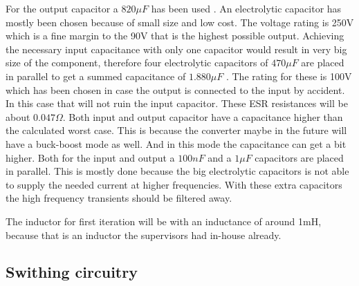 For the output capacitor a $820\mu F$ has been used \cite{cout}. An electrolytic capacitor has mostly been chosen because of small size and low cost. The voltage rating is 250V which is a fine margin to the 90V that is the highest possible output.  
Achieving the necessary input capacitance with only one capacitor would result in very big size of the component, therefore four electrolytic capacitors of $470\mu F$ \cite{cin} are placed in parallel to get a summed capacitance of $1.880\mu F$ . The rating for these is 100V which has been chosen in case the output is connected to the input by accident. In this case that will not ruin the input capacitor. These ESR resistances will be about $0.047\Omega$. Both input and output capacitor have a capacitance higher than the calculated worst case. This is because the converter maybe in the future will have a buck-boost mode as well. And in this mode the capacitance can get a bit higher. 
Both for the input and output a $100nF$ and a $1\mu F$  capacitors are placed in parallel. This is mostly done because the big electrolytic capacitors is not able to supply the needed current at higher frequencies. With these extra capacitors the high frequency transients should be filtered away.

The inductor for first iteration  will be with an inductance of around 1mH,  because that is an inductor the supervisors had in-house already.

\subsection{Swithing circuitry}










